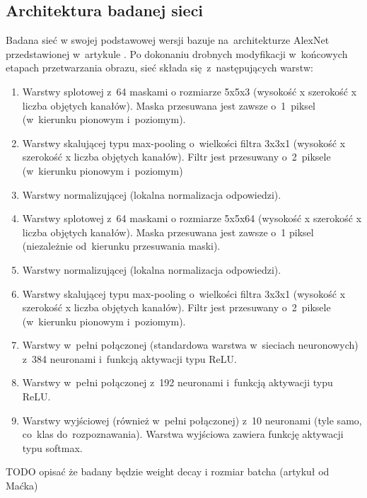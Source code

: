 \subsection{Architektura badanej sieci}
Badana sieć w swojej podstawowej wersji bazuje na~architekturze AlexNet przedstawionej w~artykule \cite{AlexNet}.
Po dokonaniu drobnych modyfikacji w~końcowych etapach przetwarzania obrazu, sieć składa się~z~następujących warstw:
\begin{enumerate}
    \item Warstwy splotowej z~64 maskami o rozmiarze 5x5x3 (wysokość x szerokość x liczba objętych kanałów).
          Maska przesuwana jest zawsze o~1~piksel (w~kierunku pionowym i~poziomym).
    \item Warstwy skalującej typu max-pooling o~wielkości filtra 3x3x1 (wysokość x szerokość x liczba objętych kanałów).
          Filtr jest przesuwany o~2~piksele (w~kierunku pionowym i~poziomym)
    \item Warstwy normalizującej (lokalna normalizacja odpowiedzi).
    \item Warstwy splotowej z~64 maskami o rozmiarze 5x5x64 (wysokość x szerokość x liczba objętych kanałów).
          Maska przesuwana jest zawsze o~1 piksel (niezależnie od~kierunku przesuwania maski).
    \item Warstwy normalizującej (lokalna normalizacja odpowiedzi).
    \item Warstwy skalującej typu max-pooling o~wielkości filtra 3x3x1 (wysokość x szerokość x liczba objętych kanałów).
          Filtr jest przesuwany o~2~piksele (w~kierunku pionowym i~poziomym).
    \item Warstwy w~pełni połączonej (standardowa warstwa w~sieciach neuronowych) z~384 neuronami i~funkcją aktywacji
          typu ReLU.
    \item Warstwy w~pełni połączonej z~192 neuronami i~funkcją aktywacji
          typu ReLU.
    \item Warstwy wyjściowej (również w~pełni połączonej) z~10 neuronami (tyle samo, co~klas do~rozpoznawania).
          Warstwa wyjściowa zawiera funkcję aktywacji typu softmax.
\end{enumerate}

TODO opisać że badany będzie weight decay i rozmiar batcha (artykuł od Maćka)
